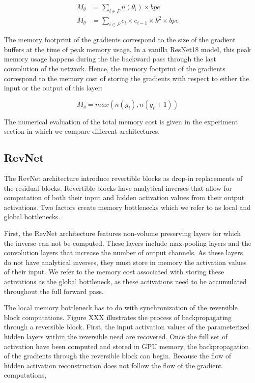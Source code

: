 \documentclass[twocolumn]{bmcart}
\begin{document}
\begin{subequations}
\begin{align}
 M_{\theta} &= \sum_{i \in P}  n(\theta_i)\times bpe \\
 M_{\theta} &= \sum_{i \in P} c_i \times c_{i-1} \times k^2 \times bpe
\end{align}
\end{subequations}

The memory footprint of the gradients correspond to the size of the gradient buffers at the time of peak memory usage. In a vanilla ResNet18 model, this peak memory usage happens during the the backward pass through the last convolution of the network.
Hence, the memory footprint of the gradients correspond to the memory cost of storing the gradients with respect to either the input or the output of this layer:

\begin{equation}
	M_{g} = max(n(g_i), n(g_i+1))
\end{equation}

The numerical evaluation of the total memory cost is given in the experiment section in which we compare different architectures.

\subsection{RevNet}
The RevNet architecture introduce revertible blocks as drop-in replacements of the residual blocks. 
Revertible blocks have analytical inverses that allow for computation of both their input and hidden activation values from their output activations. 
Two factors create memory bottlenecks which we refer to as local and global bottlenecks.

First, the RevNet architecture features non-volume preserving layers for which the inverse can not be computed. 
These layers include max-pooling layers and the convolution layers that increase the number of output channels. 
As these layers do not have analytical inverses, they must store in memory the activation values of their input. 
We refer to the memory cost associated with storing these activations as the global bottleneck, as these activations need to be accumulated throughout the full forward pass.

The local memory bottleneck has to do with synchronization of the reversible block computations. 
Figure XXX illustrates the process of backpropagating through a reversible block.
First, the input activation values of the parameterized hidden layers within the reversible need are recovered.
Once the full set of activation have been computed and stored in GPU memory, the backpropagation of the gradients through the reversible block can begin. 
Because the flow of hidden activation reconstruction does not follow the flow of the gradient computations, 
\end{document}
